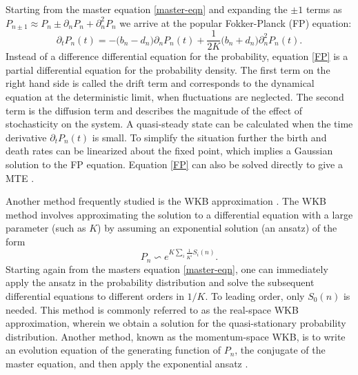 \documentclass[a4paper,10pt]{article}
\numberwithin{equation}{section} %
\begin{document}
\fi
Starting from the master equation \ref{master-eqn} and expanding the $\pm 1$ terms as $P_{n\pm 1} \approx P_n \pm \partial_n P_n + \partial^2_n P_n$ we arrive at the popular Fokker-Planck (FP) equation:
\begin{equation}
\partial_t P_n(t) = - \Big( b_n - d_n \Big) \partial_n P_n(t) + \frac{1}{2 K} \Big( b_n + d_n \Big) \partial_n^2 P_n(t).  \label{FP}
\end{equation}
Instead of a difference differential equation for the probability, equation \ref{FP} is a partial differential equation for the probability density. 
The first term on the right hand side is called the drift term and corresponds to the dynamical equation at the deterministic limit, when fluctuations are neglected. 
The second term is the diffusion term and describes the magnitude of the effect of stochasticity on the system. 
A quasi-steady state can be calculated when the time derivative $\partial_t P_n(t)$ is small. 
To simplify the situation further the birth and death rates can be linearized about the fixed point, which implies a Gaussian solution to the FP equation. 
Equation \ref{FP} can also be solved directly to give a MTE \cite{Gardiner2004}. 

Another method frequently studied is the WKB approximation \cite{}.
The WKB method involves approximating the solution to a differential equation with a large parameter (such as $K$) by assuming an exponential solution (an ansatz) of the form
\begin{equation}
P_n \backsim e^{K\sum_i \frac{1}{K^i}S_i(n)}.
\label{ansatz}
\end{equation}
Starting again from the masters equation \ref{master-eqn}, one can immediately apply the ansatz in the probability distribution and solve the subsequent differential equations to different orders in $1/K$\cite{Assaf2016,etc}.%
To leading order, only $S_0(n)$ is needed. 
This method is commonly referred to as the real-space WKB approximation, wherein we obtain a solution for the quasi-stationary probability distribution.
Another method, known as the momentum-space WKB, is to write an evolution equation of the generating function of $P_n$, the conjugate of the master equation, and then apply the exponential ansatz \cite{Generating function stuff}.
\end{document}
